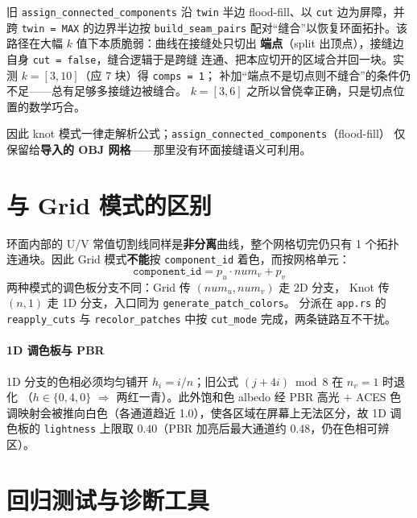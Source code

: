 \documentclass{article}
\begin{document}
旧 \texttt{assign\_connected\_components} 沿 \texttt{twin} 半边 flood-fill、以
\texttt{cut} 边为屏障，并跨 \texttt{twin = MAX} 的边界半边按 \texttt{build\_seam\_pairs}
配对“缝合”以恢复环面拓扑。该路径在大幅 $k$ 值下本质脆弱：曲线在接缝处只切出
\textbf{端点}（split 出顶点），接缝边自身 \texttt{cut = false}，缝合逻辑于是跨缝
连通、把本应切开的区域合并回一块。实测 $k=[3,10]$（应 7 块）得 \texttt{comps = 1}；
补加“端点不是切点则不缝合”的条件仍不足——总有足够多接缝边被缝合。
$k=[3,6]$ 之所以曾侥幸正确，只是切点位置的数学巧合。

因此 knot 模式一律走解析公式；\texttt{assign\_connected\_components}（flood-fill）
仅保留给\textbf{导入的 OBJ 网格}——那里没有环面接缝语义可利用。

\section{与 Grid 模式的区别}

环面内部的 U/V 常值切割线同样是\textbf{非分离}曲线，整个网格切完仍只有 1 个拓扑
连通块。因此 Grid 模式\textbf{不能}按 \texttt{component\_id} 着色，而按网格单元：
\[
\texttt{component\_id} = p_u\cdot num_v + p_v
\]
两种模式的调色板分支不同：Grid 传 $(num_u, num_v)$ 走 2D 分支，
Knot 传 $(n, 1)$ 走 1D 分支，入口同为 \texttt{generate\_patch\_colors}。
分派在 \texttt{app.rs} 的 \texttt{reapply\_cuts} 与
\texttt{recolor\_patches} 中按 \texttt{cut\_mode} 完成，两条链路互不干扰。

\paragraph{1D 调色板与 PBR}
1D 分支的色相必须均匀铺开 $h_i=i/n$；旧公式 $(j+4i)\bmod 8$ 在 $n_v=1$ 时退化
（$h\in\{0,4,0\}$ $\Rightarrow$ 两红一青）。此外饱和色 albedo 经 PBR 高光 $+$ ACES
色调映射会被推向白色（各通道趋近 1.0），使各区域在屏幕上无法区分，故 1D 调色板的
\texttt{lightness} 上限取 $0.40$（PBR 加亮后最大通道约 0.48，仍在色相可辨区）。

\section{回归测试与诊断工具}
\end{document}
